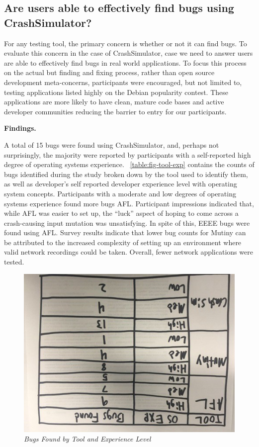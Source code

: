 \subsection{Are users able to effectively find bugs using CrashSimulator?}

For any testing tool, the primary concern is whether or not it can find
bugs.  To evaluate this concern in the case of CrashSimulator, case we need
to answer users are able to effectively find bugs in real world
applications.  To focus this process on the actual but finding and fixing
process, rather than open source development meta-concerns, participants
were encouraged, but not limited to, testing applications listed highly on
the Debian popularity contest.  These applications are more likely to have
clean, mature code bases and active developer communities reducing the
barrier to entry for our participants.

{\bf Findings. }

A total of 15 bugs were found using CrashSimulator, and, perhaps not
surprisingly, the majority were reported by participants with a
self-reported high degree of operating systems experience.
~\ref{table:fig-tool-exp} contains the
counts of bugs identified during the study broken down by
the tool used to identify them, as well as developer's self reported
developer experience level with operating system concepts.
Participants with a moderate and low degrees of operating
systems experience found more bugs AFL.  Participant impressions indicated
that, while AFL was easier to set up, the ``luck'' aspect of hoping to come
across a crash-causing input mutation was unsatisfying.  In spite of this,
EEEE bugs were found using AFL.  Survey results indicate that lower bug
counts for Mutiny can be attributed to the increased complexity of setting
up an environment where valid network recordings could be taken.  Overall,
fewer network applications were tested.

\begin{figure}[t]
  \center{}
  \includegraphics[scale=.5]{images/table1}
  \caption{\emph{Bugs Found by Tool and Experience Level}}
  \label{fig-tool-exp}
\end{figure}


